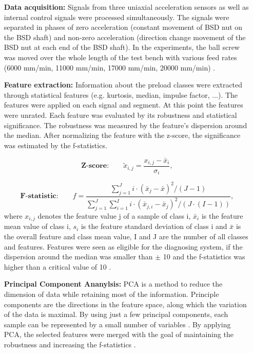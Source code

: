 \begin{itemize}
    \item [\textbf{Data acquisition:}] Signals from three uniaxial acceleration sensors as well as internal control signals were processed simultaneously. The signals were separated in phases of zero acceleration (constant movement of BSD nut on the BSD shaft) and non-zero acceleration (direction change movement of the BSD nut at each end of the BSD shaft). In the experiments, the ball screw was moved over the whole length of the test bench with various feed rates (6000 mm/min, 11000 mm/min, 17000 mm/min, 20000 mm/min) \cite{Denkena2021}.
    \item [\textbf{Feature extraction:}] Information about the preload classes were extracted through statistical features (e.g. kurtosis, median, impulse factor, ...). The features were applied on each signal and segment. At this point the features were unrated. Each feature was evaluated by its robustness and statistical significance. The robustness was measured by the feature's dispersion around the median. After normalizing the feature with the z-score, the significance was estimated by the f-statistics.
    
    \begin{equation}
        \textbf{Z-score:}\qquad \tilde{x}_{i,j} = \frac{x_{i,j} - \bar x_{i}}{\sigma_{i}},
    \end{equation}
    
    \begin{equation}
        \textbf{F-statistic:}\qquad f = \frac{\sum_{j=1}^{J} i \cdot (\bar x_{j} -\bar x)^{2}/(J-1)}{\sum_{j=1}^{J} \sum_{i=1}^{I} i \cdot (\bar x_{j,i} -\bar x_{j})^{2}/(J \cdot (I-1))},
    \end{equation}
    where ${x}_{i,j}$ denotes the feature value j of a sample of class i, $\bar{x}_{i}$ is the feature mean value of class i, ${s}_{i}$ is the feature standard deviation of class i and $\bar{x}$ is the overall feature and class mean value, I and J are the number of all classes and features.  Features were seen as eligible for the diagnosing system, if the dispersion around the median was smaller than $\pm$ 10 and the f-statistics was higher than a critical value of 10 \cite{Denkena2021}. 
    
    \item [\textbf{Principal Component Ananylsis:}] 
    PCA is a method to reduce the dimension of data while retaining most of the information. Principle components are the directions in the feature space, along which the variation of the data is maximal. By using just a few principal components, each sample can be represented by a small number of variables \cite{Ringner2008}. By applying PCA, the selected features were merged with the goal of maintaining the robustness and increasing the f-statistics \cite{Denkena2021}.
    

\end{itemize}
